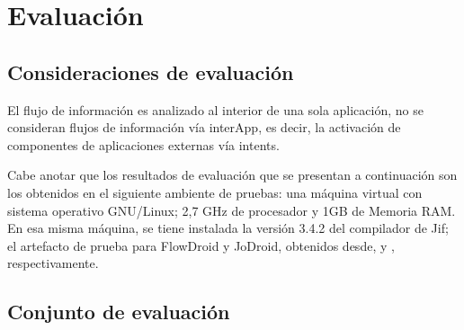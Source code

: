 \label{ch:evaluacion}
\chapter{Evaluación}

\section{Consideraciones de evaluación}
El flujo de información es analizado al interior de una sola aplicación, no se
consideran flujos de información vía interApp, es decir, la activación de
componentes de aplicaciones externas vía intents.

Cabe anotar que los resultados de evaluación que se presentan a continuación son
los obtenidos en el siguiente ambiente de pruebas: una máquina virtual con
sistema operativo GNU/Linux; 2,7 GHz de procesador y 1GB de Memoria RAM. En esa
misma máquina, se tiene instalada la versión 3.4.2 del compilador de Jif;
el artefacto de prueba para FlowDroid y JoDroid, obtenidos desde,
\cite{FlowDroid-artifact} y \cite{joDroidManual}, respectivamente.



\section{Conjunto de evaluación}
\label{sec:evalSet}

